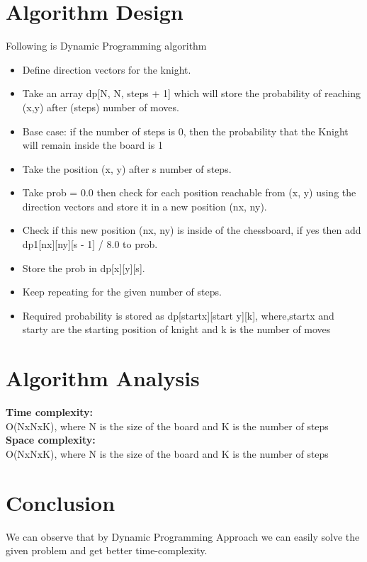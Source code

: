 \documentclass[conference]{IEEEtran}
\begin{document}
\section{Algorithm Design}
Following is Dynamic Programming algorithm

\begin{itemize}
\item Define direction vectors for the knight. 
\item Take an array dp[N, N, steps + 1] which will store the probability of reaching (x,y) after (steps) number of moves.
\item Base case: if the number of steps is 0, then the probability that the Knight will remain inside the board is 1
\item Take the position (x, y) after s number of steps.
\item Take prob = 0.0 then check for each position reachable from (x, y) using the direction vectors and store it in a new position (nx, ny).
\item Check if this new position (nx, ny) is inside of the chessboard, if yes then add dp1[nx][ny][s - 1] / 8.0 to prob.
\item Store the prob in dp[x][y][s].
\item Keep repeating for the given number of steps.
\item Required probability is stored as  dp[start\textunderscore x][start \textunderscore y][k], where,start\textunderscore x and start\textunderscore y are the starting position of knight and k is the number of moves
\end{itemize}

\section{Algorithm Analysis}
\textbf{Time complexity:}\\

O(NxNxK), where N is the size of the board and K is the number of steps
\\
\textbf{Space complexity:}\\

O(NxNxK), where N is the size of the board and K is the number of steps

\section{Conclusion}
We can observe that by Dynamic Programming Approach we can easily solve the given problem and get better time-complexity.
\end{document}
